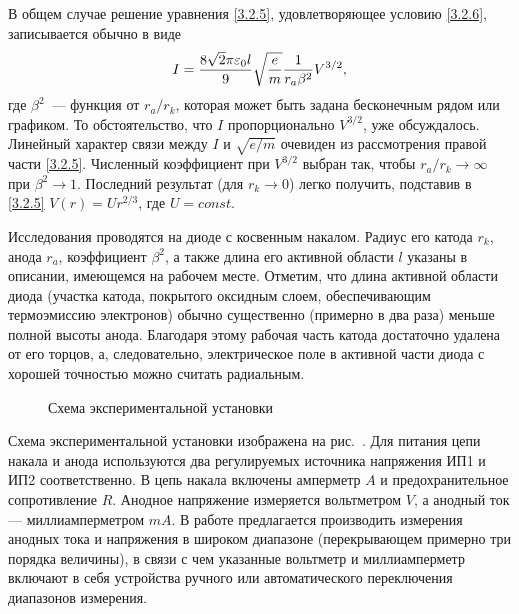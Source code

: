 В общем случае решение уравнения \eqref{3.2.5}, удовлетворяющее условию \eqref{3.2.6}, записывается обычно в виде
\begin{equation}
	I=\frac{8\sqrt{2}\pi\varepsilon_0l}{9}\sqrt{\frac{e}{m}}\frac{1}{r_a\beta^2}V^{3/2},
	\eqmark{3.2.8}
\end{equation}
где $\beta^2$~--- функция от $r_a/r_k$, которая может быть задана бесконечным рядом или графиком. То обстоятельство, что $I$ пропорционально $V^{3/2}$, уже обсуждалось. Линейный характер связи между $I$ и $\sqrt{e/m}$ очевиден из
рассмотрения правой части \eqref{3.2.5}. Численный коэффициент при $V^{3/2}$ выбран так, чтобы $r_a/r_k\rightarrow\infty$ при $\beta^2\rightarrow 1$. Последний результат (для $r_k\rightarrow 0$) легко получить, подставив в \eqref{3.2.5} $V(r)=Ur^{2/3} $, где $U=const$.

\experiment Исследования проводятся на диоде с косвенным накалом. Радиус его катода $r_k$, анода $r_a$,  коэффициент $\beta^2$, а также длина его активной области $l$  указаны в описании, имеющемся на рабочем месте. Отметим, что длина активной области диода (участка катода, покрытого оксидным слоем, обеспечивающим термоэмиссию электронов) обычно существенно (примерно в два раза) меньше полной высоты анода. Благодаря этому рабочая часть катода достаточно удалена от его торцов, а, следовательно,  электрическое поле в активной части диода с хорошей точностью можно считать радиальным.
\begin{figure}[h!]
	\caption{Схема экспериментальной установки}
\end{figure}

Схема экспериментальной установки изображена на рис.~. Для питания цепи накала и анода используются два регулируемых источника напряжения ИП1 и ИП2 соответственно. В цепь накала включены амперметр $A$ и предохранительное сопротивление $R$. Анодное напряжение измеряется вольтметром $V$, а анодный ток --- миллиамперметром $mA$. В работе предлагается производить измерения анодных тока и напряжения в широком диапазоне (перекрывающем примерно три порядка величины), в связи с чем указанные вольтметр и миллиамперметр включают в себя устройства ручного или автоматического переключения диапазонов измерения.  

